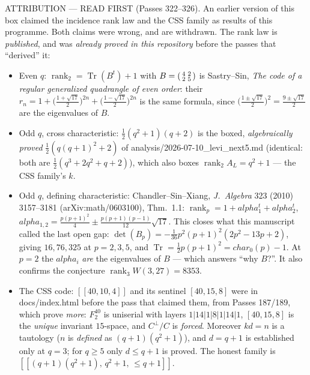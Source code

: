 \documentclass[12pt,a4paper]{article}
\def\mathrm#1{#1}%
\def\mathbf#1{#1}%
\def\textbf#1{#1}%
\def\texttt#1{#1}%
\def\alpha{alpha}%
\def\cdot{ }%
\theoremstyle{definition}
\begin{document}
\begin{center}
{{\textbf{ATTRIBUTION --- READ FIRST (Passes 322--326).} An earlier version of this
box claimed the incidence rank law and the CSS family as results of this
programme. \textbf{Both claims were wrong, and are withdrawn.} The rank law is
\emph{published}, and was \emph{already proved in this repository} before the
passes that ``derived'' it:
\begin{itemize}\itemsep0pt
\item \textbf{Even $q$:} $\operatorname{rank}_2=\operatorname{Tr}(B^t)+1$ with
$B=\begin{psmallmatrix}4&2\\2&5\end{psmallmatrix}$ \textbf{is} Sastry--Sin,
\emph{The code of a regular generalized quadrangle of even order}: their
$r_n=1+\big(\tfrac{1+\sqrt{17}}2\big)^{2n}+\big(\tfrac{1-\sqrt{17}}2\big)^{2n}$
is the same formula, since $\big(\tfrac{1\pm\sqrt{17}}2\big)^2=\tfrac{9\pm\sqrt{17}}2$
are the eigenvalues of $B$.
\item \textbf{Odd $q$, cross characteristic:} $\tfrac12(q^2+1)(q+2)$ is the boxed,
\emph{algebraically proved} $\tfrac12\!\left(q(q+1)^2+2\right)$ of
\texttt{analysis/2026-07-10\_levi\_next5.md} (identical: both are
$\tfrac12(q^3{+}2q^2{+}q{+}2)$), which also boxes $\operatorname{rank}_2A_L=q^2+1$
--- the CSS family's $k$.
\item \textbf{Odd $q$, defining characteristic:} Chandler--Sin--Xiang,
\emph{J.\ Algebra} \textbf{323} (2010) 3157--3181 (arXiv:math/0603100), Thm.~1.1:
$\operatorname{rank}_p=1+\alpha_1^t+\alpha_2^t$,
$\alpha_{1,2}=\tfrac{p(p+1)^2}4\pm\tfrac{p(p+1)(p-1)}{12}\sqrt{17}$. This
\textbf{closes} what this manuscript called the last open gap: $\det(B_p)=
-\tfrac1{36}p^2(p+1)^2(2p^2{-}13p{+}2)$, giving $16,76,325$ at $p=2,3,5$, and
$\operatorname{Tr}=\tfrac12p(p+1)^2=\mathrm{char}_0(p)-1$. At $p=2$ the $\alpha_i$
\emph{are} the eigenvalues of $B$ --- which answers ``why $B$?''. It also confirms
the conjecture $\operatorname{rank}_3W(3,27)=8353$.
\item \textbf{The CSS code:} $[[40,10,4]]$ and its sentinel $[40,15,8]$ were in
\texttt{docs/index.html} before the pass that claimed them, from Passes 187/189,
which prove \emph{more}: $\mathbf F_2^{40}$ is uniserial with layers
$1|14|1|8|1|14|1$, $[40,15,8]$ is the \emph{unique} invariant $15$-space, and
$C^\perp\!/C$ is \emph{forced}. Moreover $k\cdot d=n$ is a \textbf{tautology}
($n$ is \emph{defined} as $(q+1)(q^2+1)$), and $d=q+1$ is established only at
$q=3$; for $q\ge5$ only $d\le q+1$ is proved. The honest family is
$[[(q+1)(q^2+1),\,q^2+1,\,\le q+1]]$.
\end{itemize}

}}
\end{center}
\end{document}
